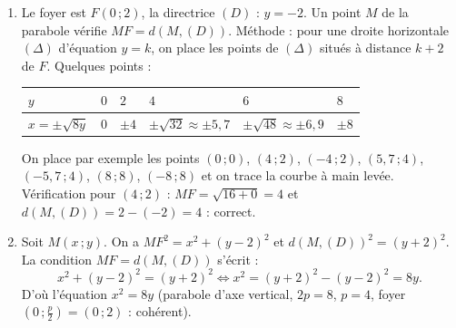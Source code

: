 \documentclass[11pt]{article}
\begin{document}
\begin{corrige}
\begin{enumerate}
\item Le foyer est $F(0\,;2)$, la directrice $(D)$ : $y=-2$. Un point $M$ de la parabole vérifie $MF=d(M,(D))$. Méthode : pour une droite horizontale $(\Delta)$ d'équation $y=k$, on place les points de $(\Delta)$ situés à distance $k+2$ de $F$. Quelques points :
\begin{center}
\begin{tabularx}{\linewidth}{|l|X|X|X|X|X|}\hline
\rowcolor{popblueL} $y$ & $0$ & $2$ & $4$ & $6$ & $8$ \\ \hline
$x=\pm\sqrt{8y}$ & $0$ & $\pm 4$ & $\pm\sqrt{32}\approx\pm 5,7$ & $\pm\sqrt{48}\approx\pm 6,9$ & $\pm 8$ \\ \hline
\end{tabularx}
\end{center}
On place par exemple les points $(0\,;0)$, $(4\,;2)$, $(-4\,;2)$, $(5,7\,;4)$, $(-5,7\,;4)$, $(8\,;8)$, $(-8\,;8)$ et on trace la courbe à main levée. Vérification pour $(4\,;2)$ : $MF=\sqrt{16+0}=4$ et $d(M,(D))=2-(-2)=4$ : correct.
\item Soit $M(x\,;y)$. On a $MF^{2}=x^{2}+(y-2)^{2}$ et $d(M,(D))^{2}=(y+2)^{2}$. La condition $MF=d(M,(D))$ s'écrit :
\[ x^{2}+(y-2)^{2}=(y+2)^{2} \iff x^{2}=(y+2)^{2}-(y-2)^{2}=8y. \]
D'où l'équation $x^{2}=8y$ (parabole d'axe vertical, $2p=8$, $p=4$, foyer $(0\,;\tfrac{p}{2})=(0\,;2)$ : cohérent).
\end{enumerate}
\end{corrige}
\end{document}
